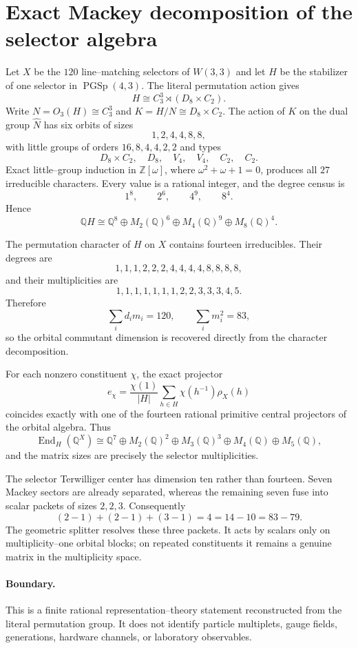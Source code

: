 \section{Exact Mackey decomposition of the selector algebra}
\label{sec:mackey-selector-decomposition}

Let $X$ be the $120$ line--matching selectors of $W(3,3)$ and let $H$ be the stabilizer of one selector in $\operatorname{PGSp}(4,3)$.  The literal permutation action gives
\[
H\cong C_3^3\rtimes(D_8\times C_2).
\]
Write $N=O_3(H)\cong C_3^3$ and $K=H/N\cong D_8\times C_2$.  The action of $K$ on the dual group $\widehat N$ has six orbits of sizes
\[
1,2,4,4,8,8,
\]
with little groups of orders $16,8,4,4,2,2$ and types
\[
D_8\times C_2,\quad D_8,\quad V_4,\quad V_4,\quad C_2,\quad C_2.
\]
Exact little--group induction in $\mathbb Z[\omega]$, where $\omega^2+\omega+1=0$, produces all $27$ irreducible characters.  Every value is a rational integer, and the degree census is
\[
1^8,\qquad 2^6,\qquad 4^9,\qquad 8^4.
\]
Hence
\[
\mathbb QH\cong
\mathbb Q^8\oplus M_2(\mathbb Q)^6\oplus
M_4(\mathbb Q)^9\oplus M_8(\mathbb Q)^4.
\]

The permutation character of $H$ on $X$ contains fourteen irreducibles.  Their degrees are
\[
1,1,1,2,2,2,4,4,4,4,8,8,8,8,
\]
and their multiplicities are
\[
1,1,1,1,1,1,1,2,2,3,3,3,4,5.
\]
Therefore
\[
\sum_i d_i m_i=120,
\qquad
\sum_i m_i^2=83,
\]
so the orbital commutant dimension is recovered directly from the character decomposition.

For each nonzero constituent $\chi$, the exact projector
\[
e_\chi=
\frac{\chi(1)}{|H|}
\sum_{h\in H}\chi(h^{-1})\rho_X(h)
\]
coincides exactly with one of the fourteen rational primitive central projectors of the orbital algebra.  Thus
\[
\operatorname{End}_H(\mathbb Q^X)
\cong
\mathbb Q^7\oplus M_2(\mathbb Q)^2\oplus
M_3(\mathbb Q)^3\oplus M_4(\mathbb Q)\oplus M_5(\mathbb Q),
\]
and the matrix sizes are precisely the selector multiplicities.

The selector Terwilliger center has dimension ten rather than fourteen.  Seven Mackey sectors are already separated, whereas the remaining seven fuse into scalar packets of sizes $2,2,3$.  Consequently
\[
(2-1)+(2-1)+(3-1)=4=14-10=83-79.
\]
The geometric splitter resolves these three packets.  It acts by scalars only on multiplicity--one orbital blocks; on repeated constituents it remains a genuine matrix in the multiplicity space.

\paragraph{Boundary.}
This is a finite rational representation--theory statement reconstructed from the literal permutation group.  It does not identify particle multiplets, gauge fields, generations, hardware channels, or laboratory observables.
